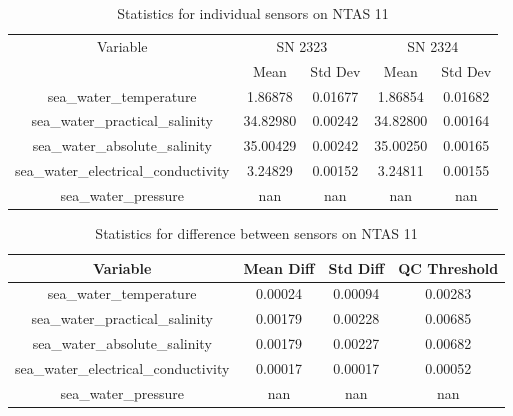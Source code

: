 \begin{table}[h]
\centering
\begin{tabular}{|c|c|c|c|c|}
\hline
Variable & \multicolumn{2}{c|}{SN 2323} & \multicolumn{2}{c|}{SN 2324} \\
& Mean & Std Dev & Mean & Std Dev \\
\hline
sea\_water\_temperature & 1.86878 & 0.01677 & 1.86854 & 0.01682 \\
sea\_water\_practical\_salinity & 34.82980 & 0.00242 & 34.82800 & 0.00164 \\
sea\_water\_absolute\_salinity & 35.00429 & 0.00242 & 35.00250 & 0.00165 \\
sea\_water\_electrical\_conductivity & 3.24829 & 0.00152 & 3.24811 & 0.00155 \\
sea\_water\_pressure & nan & nan & nan & nan \\
\hline
\end{tabular}
\caption{Statistics for individual sensors on NTAS 11}
\end{table}

\begin{table}[h]
\centering
\begin{tabular}{|c|c|c|c|}
\hline
Variable & Mean Diff & Std Diff & QC Threshold \\
\hline
sea\_water\_temperature & 0.00024 & 0.00094 & 0.00283 \\
sea\_water\_practical\_salinity & 0.00179 & 0.00228 & 0.00685 \\
sea\_water\_absolute\_salinity & 0.00179 & 0.00227 & 0.00682 \\
sea\_water\_electrical\_conductivity & 0.00017 & 0.00017 & 0.00052 \\
sea\_water\_pressure & nan & nan & nan \\
\hline
\end{tabular}
\caption{Statistics for difference between sensors on NTAS 11}
\end{table}
